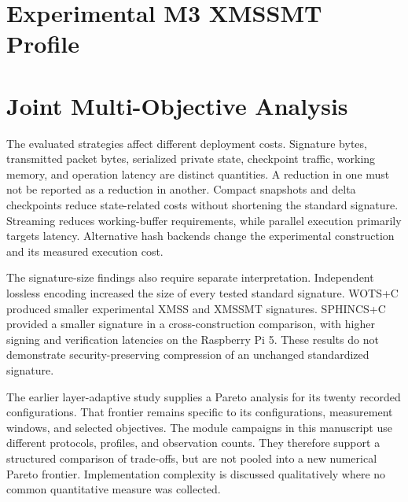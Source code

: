 \documentclass[pdflatex,sn-mathphys-num]{sn-jnl}
\begin{document}
\section{Experimental M3 XMSSMT Profile}
\label{sec:m3}















\section{Joint Multi-Objective Analysis}
\label{sec:joint}

The evaluated strategies affect different deployment costs.
Signature bytes, transmitted packet bytes, serialized private state,
checkpoint traffic, working memory, and operation latency are distinct
quantities. A reduction in one must not be reported as a reduction in
another. Compact snapshots and delta checkpoints reduce state-related
costs without shortening the standard signature. Streaming reduces
working-buffer requirements, while parallel execution primarily targets
latency. Alternative hash backends change the experimental construction
and its measured execution cost.

The signature-size findings also require separate interpretation.
Independent lossless encoding increased the size of every tested
standard signature. WOTS+C produced smaller experimental XMSS and
XMSSMT signatures. SPHINCS+C provided a smaller signature in a
cross-construction comparison, with higher signing and verification
latencies on the Raspberry Pi 5. These results do not demonstrate
security-preserving compression of an unchanged standardized signature.

The earlier layer-adaptive study supplies a Pareto analysis for its
twenty recorded configurations. That frontier remains specific to
its configurations, measurement windows, and selected objectives.
The module campaigns in this manuscript use different protocols,
profiles, and observation counts. They therefore support a structured
comparison of trade-offs, but are not pooled into a new numerical
Pareto frontier. Implementation complexity is discussed qualitatively
where no common quantitative measure was collected.
\end{document}
